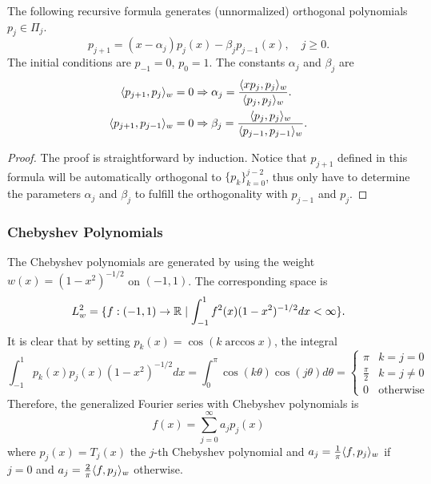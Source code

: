 \begin{theorem}
\label{Thm: 3-Ort-Poly-Gen}
    The following recursive formula generates (unnormalized) orthogonal polynomials $p_j\in \Pi_j$.
\begin{equation}\label{EQ: RECUR}
    p_{j+1} = (x - \alpha_j) p_j(x) - \beta_j p_{j-1}(x),\quad j\ge 0.
\end{equation}
The initial conditions are $p_{-1} = 0$, $p_0 = 1$. The constants $\alpha_j$ and $\beta_j$ are
\begin{equation}
    \begin{aligned}
        \langle {p_{j+1}, p_j} \rangle_w &= 0\Rightarrow \alpha_j = \frac{\langle {xp_j, p_j} \rangle_w}{\langle {p_j, p_j} \rangle_w}. \\
        \langle {p_{j+1}, p_{j-1}} \rangle_w &= 0\Rightarrow \beta_j = \frac{\langle {p_j, p_j} \rangle_w}{\langle {p_{j-1}, p_{j-1}} \rangle_w}  .  
    \end{aligned}
\end{equation}
\end{theorem}
\begin{proof}
    The proof is straightforward by induction. Notice that $p_{j+1}$ defined in this formula will be automatically orthogonal to $\{p_k\}_{k=0}^{j-2}$, thus only have to determine the parameters $\alpha_j$ and $\beta_j$ to fulfill the orthogonality with $p_{j-1}$ and $p_{j}$. 
\end{proof}
\subsubsection{Chebyshev Polynomials}
\label{SSSec: 3-Che-Pol}
The Chebyshev polynomials are generated by using the weight $w(x) = (1- x^2)^{-1/2}$ on $(-1, 1)$. The corresponding space is 
$$L_{w}^2 = \{ f:(-1,1)\to \mathbb R\mid \int_{-1}^1 f^2(x) (1 - x^2)^{-1/2}dx <\infty\}. $$
It is clear that by setting $p_k(x) = \cos(k \arccos x)$, the integral 
\begin{equation}
    \int_{-1}^1 p_k(x) p_j(x) (1 - x^2)^{-1/2} dx = \int_{0}^{\pi} \cos(k \theta) \cos(j\theta) d\theta = \begin{cases}
        \pi & k = j = 0\\
        \frac{\pi}{2} & k = j\neq 0\\
        0 & \text{otherwise}
    \end{cases}
\end{equation}
Therefore, the generalized Fourier series with Chebyshev polynomials is 
$$f(x) = \sum_{j=0}^{\infty} a_j p_j(x)$$
where $p_j (x)= T_j(x)$ the $j$-th Chebyshev polynomial and $a_j = \frac{1}{\pi}\langle {f, p_j} \rangle_w$ if $j = 0$ and $a_j = \frac{2}{\pi}\langle {f, p_j} \rangle_w$ otherwise.

